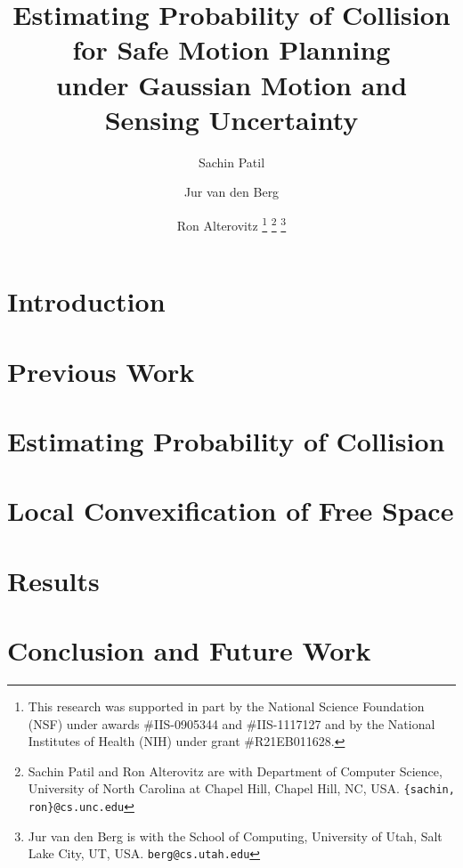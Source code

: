 \documentclass[letterpaper, 10 pt, conference]{ieeeconf}
\title{\LARGE \bf
Estimating Probability of Collision for Safe Motion Planning \\ under Gaussian Motion and Sensing Uncertainty
}
\author{Sachin Patil \and Jur van den Berg \and Ron Alterovitz%
\thanks{This research was supported in part by the National Science Foundation (NSF) under awards \#IIS-0905344 and \#IIS-1117127 and by the National Institutes of Health (NIH) under grant \#R21EB011628.}
\thanks{Sachin Patil and Ron Alterovitz are with Department of Computer Science, University of North Carolina at Chapel Hill, Chapel Hill, NC, USA.
       {\tt\small \{sachin, ron\}@cs.unc.edu}}%
\thanks{Jur van den Berg is with the School of Computing, University of Utah, Salt Lake City, UT, USA.
       {\tt\small berg@cs.utah.edu}}%
}
\begin{document}
\maketitle
\thispagestyle{empty}
\pagestyle{empty}



\section{Introduction} \label{sec:intro}


\section{Previous Work} \label{sec:prevwork}


%

\section{Estimating Probability of Collision} \label{sec:probcol}


\section{Local Convexification of Free Space} \label{sec:cvxfn}


\section{Results} \label{sec:results}


\section{Conclusion and Future Work} \label{sec:discussion}






\end{document}
